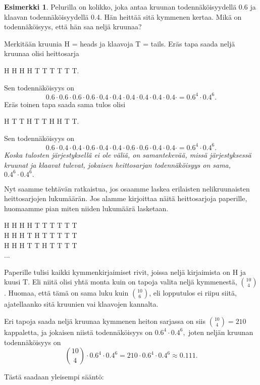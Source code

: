 \documentclass[12pt,leqno,a4paper,oneside]{amsart}
\theoremstyle{definition}
\newtheorem{example}[proclaim]{Esimerkki}
\theoremstyle{remark}
\numberwithin{equation}{section}
\begin{document}
\begin{example}
 Pelurilla on kolikko, joka antaa kruunan todennäköisyydellä 0.6 ja klaavan todennäköisyydellä 0.4. Hän heittää sitä kymmenen kertaa. Mikä
 on todennäköisyys, että hän saa neljä kruunaa?
 
 Merkitään kruunia H = heads ja klaavoja T = tails. Eräs tapa saada neljä kruunaa olisi heittosarja\\
 \begin{center}
  H H H H T T T T T T.
 \end{center}
 Sen todennäköisyys on
 $$0.6\cdot 0.6\cdot 0.6\cdot 0.6\cdot 0.4\cdot 0.4\cdot 0.4\cdot 0.4\cdot 0.4\cdot 0.4\cdot = 0.6^4 \cdot 0.4^6 .$$
 Eräs toinen tapa saada sama tulos olisi
 \begin{center}
  H T T H T T H H T T.
 \end{center}
 Sen todennäköisyys on
 $$0.6\cdot 0.4\cdot 0.4\cdot 0.6\cdot 0.4\cdot 0.4\cdot 0.6\cdot 0.6\cdot 0.4\cdot 0.4\cdot = 0.6^4 \cdot 0.4^6 .$$
 \emph{Koska tulosten järjestyksellä ei ole väliä, on samantekevää, missä järjestyksessä kruunat ja klaavat tulevat, jokaisen 
 heittosarjan todennäköisyys on sama,} $0.4^6 \cdot 0.4^6 .$
 
 Nyt saamme tehtävän ratkaistua, jos osaamme laskea erilaisten nelikruunaisten heittosarjojen lukumäärän. Jos alamme kirjoittaa näitä heittosarjoja 
 paperille, huomaamme pian miten niiden lukumäärä lasketaan.
 \begin{center}
  H H H H T T T T T T\\
  H H H T H T T T T T\\
  H H H T T H T T T T\\
  ...
 \end{center}
 Paperille tulisi kaikki kymmenkirjaimiset rivit, joissa neljä kirjaimista on H ja kuusi T. Eli niitä olisi yhtä monta kuin on tapoja valita neljä 
 kymmenestä, ${10 \choose 4}$. Huomaa, että tämä on sama luku kuin ${10\choose 6}$, eli lopputulos ei riipu siitä, ajatellaanko sitä kruunien vai klaavojen
 kannalta.
 
 Eri tapoja saada neljä kruunaa kymmenen heiton sarjassa on siis ${10\choose 4 } = 210$ kappaletta, ja jokaisen niistä todennäköisyys on
 $0.6^4 \cdot 0.4^6 ,$ joten neljän kruunan todennäköisyys on
 $${10\choose 4 } \cdot 0.6^4 \cdot 0.4^6 = 210\cdot 0.6^4 \cdot 0.4^6 \approx 0.111.$$
\end{example}

Tästä saadaan yleisempi sääntö:
\begin{center}
\end{center}
\end{document}
